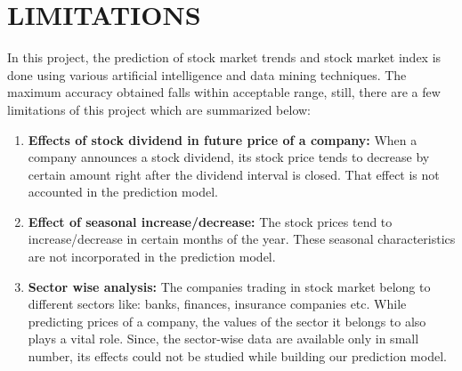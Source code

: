 \section{LIMITATIONS}
In this project, the prediction of stock market trends and stock market index is done using various artificial intelligence and data mining techniques. The maximum accuracy obtained falls within acceptable range, still, there are a few limitations of this project which are summarized below:
\begin{enumerate}
	\item \textbf{Effects of stock dividend in future price of a company:} When a company announces a stock dividend, its stock price tends to decrease by certain amount right after the dividend interval is closed. That effect is not accounted in the prediction model. 
	\item \textbf{Effect of seasonal increase/decrease:} The stock prices tend to increase/decrease in certain months of the year. These seasonal characteristics are not incorporated in the prediction model.
	\item \textbf{Sector wise analysis:} The companies trading in stock market belong to different sectors like: banks, finances, insurance companies etc. While predicting prices of a company, the values of the sector it belongs to also plays a vital role. Since, the sector-wise data are available only in small number, its effects could not be studied while building our prediction model. 
\end{enumerate}


